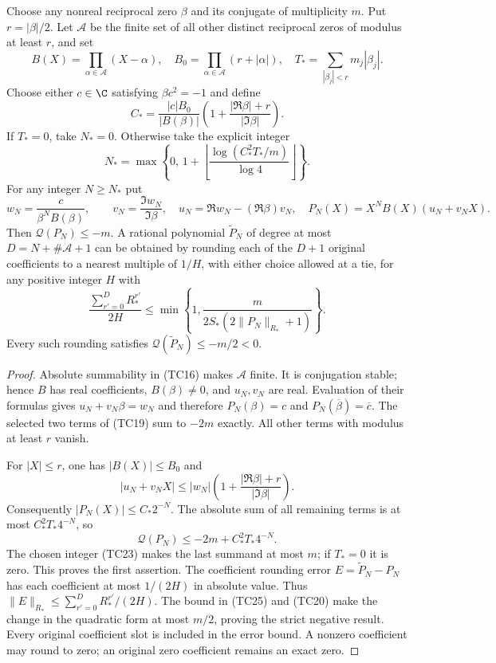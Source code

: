 \begin{theorem}
Choose any nonreal reciprocal zero $\beta$ and its conjugate of
multiplicity $m$. Put $r=|\beta|/2$. Let $\mathcal A$ be the finite
set of all other distinct reciprocal zeros of modulus at least
$r$, and set
\[
B(X)=\prod_{\alpha\in\mathcal A}(X-\alpha),\quad
B_0=\prod_{\alpha\in\mathcal A}(r+|\alpha|),\quad
T_*=\sum_{|\beta_j|<r}m_j|\beta_j|.
\tag{TC21}
\]
Choose either $c\in\C$ satisfying $\beta c^2=-1$ and define
\[
C_*=\frac{|c|B_0}{|B(\beta)|}
\left(1+\frac{|\Re\beta|+r}{|\Im\beta|}\right).
\tag{TC22}
\]
If $T_*=0$, take $N_*=0$. Otherwise take the explicit integer
\[
N_*=\max\left\{0,\,
1+\left\lfloor\frac{\log(C_*^2T_*/m)}{\log4}\right\rfloor\right\}.
\tag{TC23}
\]
For any integer $N\ge N_*$ put
\[
w_N=\frac{c}{\beta^NB(\beta)},\qquad
v_N=\frac{\Im w_N}{\Im\beta},\quad
u_N=\Re w_N-(\Re\beta)v_N,\quad
P_N(X)=X^NB(X)(u_N+v_NX).
\tag{TC24}
\]
Then $\mathcal Q(P_N)\le-m$. A rational polynomial
$\widetilde P_N$ of degree at most
$D=N+\#\mathcal A+1$ can be obtained by rounding each of the
$D+1$ original coefficients to a nearest multiple of $1/H$,
with either choice allowed at a tie, for any
positive integer $H$ with
\[
\frac{\sum_{r'=0}^D R_*^{r'}}{2H}
\le
\min\left\{1,\frac{m}{2S_*(2\|P_N\|_{R_*}+1)}\right\}.
\tag{TC25}
\]
Every such rounding satisfies
$\mathcal Q(\widetilde P_N)\le-m/2<0$.
\end{theorem}
\begin{proof}
Absolute summability in (TC16) makes $\mathcal A$ finite.
It is conjugation stable; hence $B$ has real coefficients,
$B(\beta)\ne0$, and $u_N,v_N$ are real. Evaluation of their
formulas gives $u_N+v_N\beta=w_N$ and therefore
$P_N(\beta)=c$ and $P_N(\overline\beta)=\overline c$.
The selected two terms of (TC19) sum to $-2m$ exactly.
All other terms with modulus at least $r$ vanish.

For $|X|\le r$, one has $|B(X)|\le B_0$ and
\[
|u_N+v_NX|
\le |w_N|\left(1+\frac{|\Re\beta|+r}{|\Im\beta|}\right).
\]
Consequently $|P_N(X)|\le C_*2^{-N}$. The absolute sum of
all remaining terms is at most $C_*^2T_*4^{-N}$, so
\[
\mathcal Q(P_N)\le-2m+C_*^2T_*4^{-N}.
\tag{TC26}
\]
The chosen integer (TC23) makes the last summand at most $m$;
if $T_*=0$ it is zero. This proves the first assertion.
The coefficient rounding error $E=\widetilde P_N-P_N$ has
each coefficient at most $1/(2H)$ in absolute value.
Thus $\|E\|_{R_*}\le\sum_{r'=0}^DR_*^{r'}/(2H)$.
The bound in (TC25) and (TC20) make the change in the quadratic
form at most $m/2$, proving the strict negative result.
Every original coefficient slot is included in the error bound.
A nonzero coefficient may round to zero; an original zero
coefficient remains an exact zero.
\end{proof}

